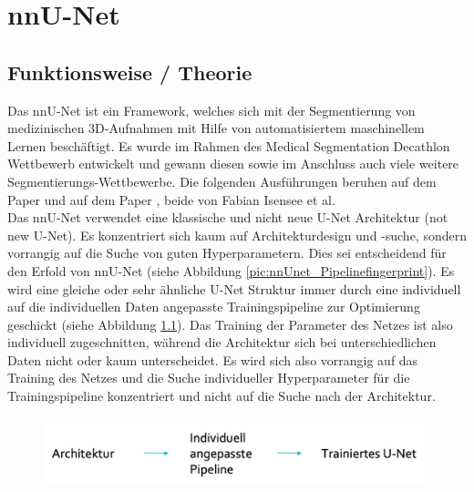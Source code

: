 \chapter{nnU-Net}
\label{ch:nnunet}


\section{Funktionsweise / Theorie}



Das nnU-Net ist ein Framework, welches sich mit der Segmentierung von medizinischen 3D-Aufnahmen mit Hilfe von automatisiertem maschinellem Lernen beschäftigt. Es wurde im Rahmen des Medical Segmentation Decathlon Wettbewerb entwickelt und gewann diesen sowie im Anschluss auch viele weitere Segmentierungs-Wettbewerbe. Die folgenden Ausführungen beruhen auf dem Paper \cite{nnunetPaper} und auf dem Paper \cite{nnunetPaperB} , beide von Fabian Isensee et al. \\
Das nnU-Net verwendet eine klassische und nicht neue U-Net Architektur (not new U-Net). Es konzentriert sich kaum auf  Architekturdesign und -suche, sondern vorrangig auf die Suche von guten Hyperparametern. Dies sei entscheidend für den Erfold von nnU-Net (siehe Abbildung \ref{pic:nnUnet_Pipelinefingerprint}). Es wird eine gleiche oder sehr ähnliche U-Net Struktur immer durch eine individuell auf die individuellen Daten angepasste Trainingspipeline zur Optimierung geschickt (siehe Abbildung \ref{pic:nnUnet_Basisschema}). Das Training der Parameter des Netzes ist also individuell zugeschnitten, während die Architektur sich bei unterschiedlichen Daten nicht oder kaum unterscheidet. Es wird sich also vorrangig auf das Training des Netzes und die Suche individueller Hyperparameter für die Trainingspipeline konzentriert und nicht auf die Suche nach der Architektur. 

\begin{figure}[H]
	
	\centering
	\includegraphics[scale=0.3]{Pictures/nnUnet/Bild01.png}
	\caption{}
	\label{pic:nnUnet_Basisschema}
\end{figure}



